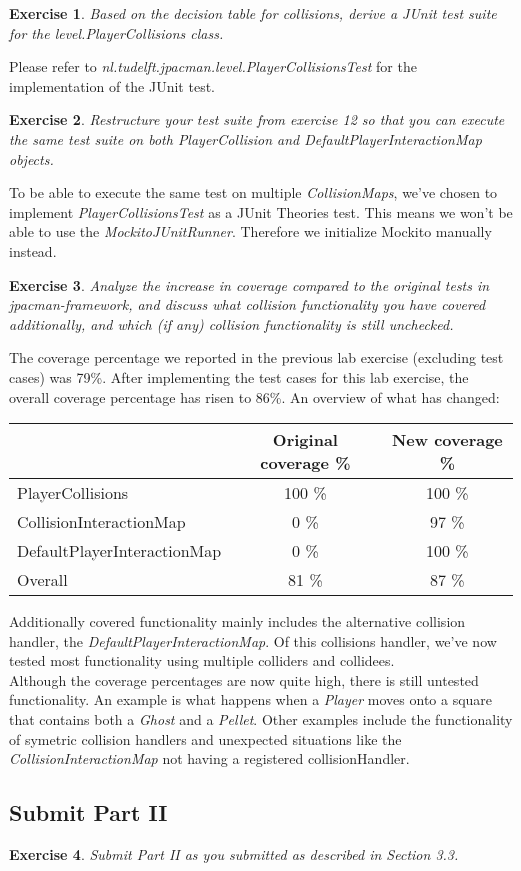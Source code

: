 \documentclass[a4paper]{article}
\newtheorem{thm}{Exercise}
\begin{document}
    \begin{thm}
      Based on the decision table for collisions, derive a JUnit test suite for the
      level.PlayerCollisions class.
    \end{thm}
    Please refer to \textit{nl.tudelft.jpacman.level.PlayerCollisionsTest} for the implementation of the JUnit test.

    \begin{thm}
      Restructure your test suite from exercise 12 so that you can execute the same test
      suite on both PlayerCollision and DefaultPlayerInteractionMap objects.
    \end{thm}
    To be able to execute the same test on multiple \textit{CollisionMaps}, we've chosen to implement \textit{PlayerCollisionsTest} as a JUnit Theories test.
    This means we won't be able to use the \textit{MockitoJUnitRunner}. Therefore we initialize Mockito manually instead.
    
    \newpage
    \begin{thm}
      Analyze the increase in coverage compared to the original tests in jpacman-framework,
      and discuss what collision functionality you have covered additionally,
      and which (if any) collision functionality is still unchecked.
    \end{thm}
    The coverage percentage we reported in the previous lab exercise (excluding test cases) was 79\%.
    After implementing the test cases for this lab exercise, the overall coverage percentage has risen to 86\%.
    An overview of what has changed:
    \begin{table}[ht]
      \begin{tabular}{|l|c|c|}
        \cline{2-3}
        \multicolumn{1}{l|}{}		& Original coverage \%	& New coverage \%	\\ \hline
        PlayerCollisions		& 100 \%		& 100 \%		\\ \hline
        CollisionInteractionMap		& 0 \%			& 97 \%			\\ \hline
        DefaultPlayerInteractionMap	& 0 \%			& 100 \%		\\ \hline
        Overall				& 81 \%			& 87 \%			\\ \hline
      \end{tabular}
    \end{table}
    Additionally covered functionality mainly includes the alternative collision handler, the \textit{DefaultPlayerInteractionMap}.
    Of this collisions handler, we've now tested most functionality using multiple colliders and collidees. \\
    Although the coverage percentages are now quite high, there is still untested functionality.
    An example is what happens when a \textit{Player} moves onto a square that contains both a \textit{Ghost} and a \textit{Pellet}.
    Other examples include the functionality of symetric collision handlers and unexpected situations
    like the \textit{CollisionInteractionMap} not having a registered collisionHandler.
  
  \subsection{Submit Part II}
    \begin{thm}
      Submit Part II as you submitted as described in Section 3.3.
    \end{thm}
\end{document}
